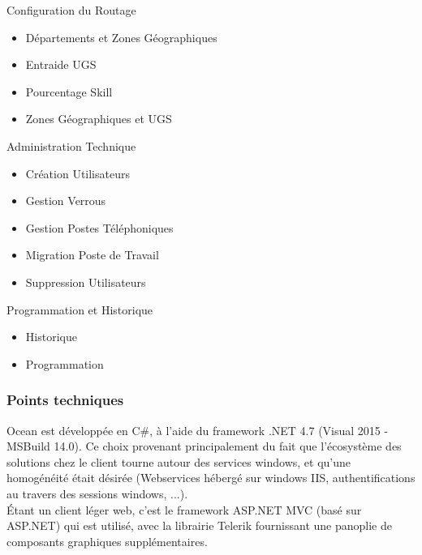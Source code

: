 \documentclass{rapport}
\begin{document}
\begin{itemize}
\begin{minipage}{0.5\textwidth}
    \item Configuration du Routage
        \begin{itemize}
        \item Départements et Zones Géographiques
        \item Entraide UGS
        \item Pourcentage Skill
        \item Zones Géographiques et UGS
        \end{itemize}
    \vspace{5mm} %
    \item Administration Technique
        \begin{itemize}
        \item Création Utilisateurs
        \item Gestion Verrous
        \item Gestion Postes Téléphoniques
        \item Migration Poste de Travail
        \item Suppression Utilisateurs
        \end{itemize}
    \vspace{5mm} %
    \item Programmation et Historique
        \begin{itemize}
        \item Historique
        \item Programmation
        \end{itemize}
\end{minipage}
\end{itemize}


\subsubsection{Points techniques}

Ocean est développée en C\#, à l'aide du framework .NET 4.7 (Visual 2015 - MSBuild 14.0). Ce choix provenant principalement du fait que l'écosystème des solutions chez le client tourne autour des services windows, et qu'une homogénéité était désirée (Webservices hébergé sur windows IIS, authentifications au travers des sessions windows, ...).\\
Étant un client léger web, c'est le framework ASP.NET MVC (basé sur ASP.NET) qui est utilisé, avec la librairie Telerik fournissant une panoplie de composants graphiques supplémentaires.\\
\end{document}

